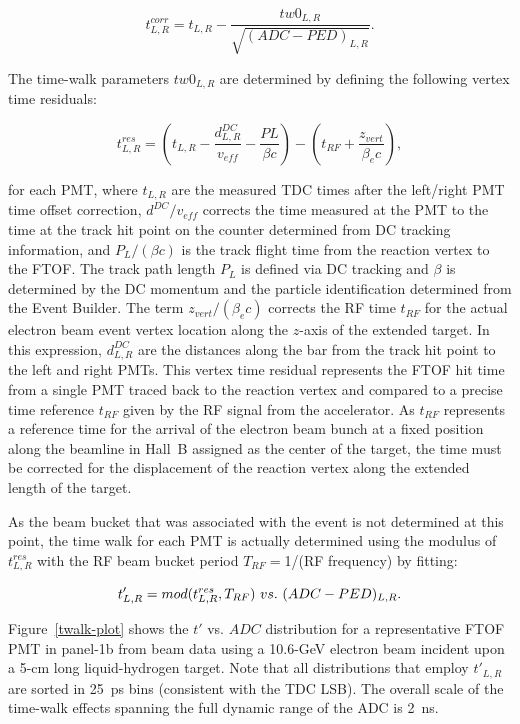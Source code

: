 \documentclass{elsart}
\begin{document}
\begin{equation}
\label{tw-func}
t^{corr}_{L,R} = t_{L,R} - \frac{tw0_{L,R}}{\sqrt{(ADC - PED)_{L,R}}}.
\end{equation}

The time-walk parameters $tw0_{L,R}$ are determined by defining the following vertex time residuals:

\begin{equation}
\label{tres}
t_{L,R}^{res} = \left(t_{L,R} - \frac{d_{L,R}^{DC}}{v_{eff}} - \frac{PL}{\beta c} \right) 
- \left( t_{RF} + \frac{z_{vert}}{\beta_e c} \right),
\end{equation}

\noindent
for each PMT, where $t_{L,R}$ are the measured TDC times after the left/right PMT time offset
correction, $d^{DC}/v_{eff}$ corrects the time measured at the PMT to the time at the track hit
point on the counter determined from DC tracking information, and $P_L/(\beta c)$ is the track
flight time from the reaction vertex to the FTOF. The track path length $P_L$ is defined via DC
tracking and $\beta$ is determined by the DC momentum and the particle identification determined
from the Event Builder. The term $z_{vert}/(\beta_e c)$ corrects the RF time $t_{RF}$ for the actual
electron beam event vertex location along the $z$-axis of the extended target. In this expression,
$d_{L,R}^{DC}$ are the distances along the bar from the track hit point to the left and right PMTs.
This vertex time residual represents the FTOF hit time from a single PMT traced back to the reaction
vertex and compared to a precise time reference $t_{RF}$ given by the RF signal from the accelerator.
As $t_{RF}$ represents a reference time for the arrival of the electron beam bunch at a fixed
position along the beamline in Hall~B assigned as the center of the target, the time must be corrected
for the displacement of the reaction vertex along the extended length of the target.

As the beam bucket that was associated with the event is not determined at this point, the 
time walk for each PMT is actually determined using the modulus of $t^{res}_{L,R}$ with the RF
beam bucket period $T_{RF}=$1/(RF frequency) by fitting:

\begin{equation}
t'_{L,R} = mod (t^{res}_{L,R}, T_{RF})~{\rm vs.}~(ADC-PED)_{L,R}.
\end{equation}

Figure~\ref{twalk-plot} shows the $t'$ vs. $ADC$ distribution for a representative FTOF PMT in
panel-1b from beam data using a 10.6-GeV electron beam incident upon a 5-cm long liquid-hydrogen
target. Note that all distributions that employ $t'_{L,R}$ are sorted in 25~ps bins (consistent with
the TDC LSB). The overall scale of the time-walk effects spanning the full dynamic range of the
ADC is 2~ns.
\end{document}
